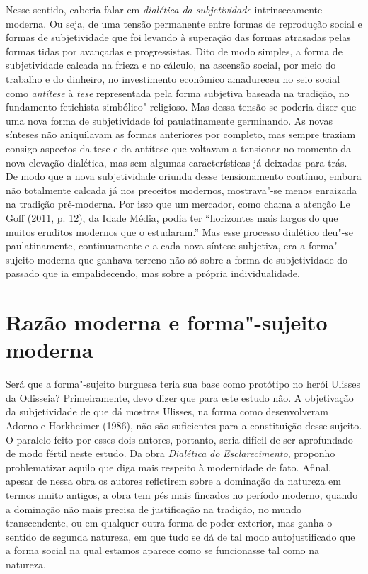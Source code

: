 Nesse sentido, caberia falar em \emph{dialética da subjetividade}
intrinsecamente moderna. Ou seja, de uma tensão permanente entre
formas de reprodução social e formas de subjetividade que foi levando à
superação das formas atrasadas pelas formas tidas por avançadas e
progressistas. Dito de modo simples, a forma de subjetividade calcada na
frieza e no cálculo, na ascensão social, por meio do trabalho e do
dinheiro, no investimento econômico amadureceu no seio social como
\emph{antítese} à \emph{tese} representada pela forma subjetiva baseada
na tradição, no fundamento fetichista simbólico"-religioso. Mas dessa
tensão se poderia dizer que uma nova forma de subjetividade foi
paulatinamente germinando. As novas sínteses não aniquilavam as formas
anteriores por completo, mas sempre traziam consigo aspectos da tese e
da antítese que voltavam a tensionar no momento da nova elevação
dialética, mas sem algumas características já deixadas para trás. De
modo que a nova subjetividade oriunda desse tensionamento contínuo,
embora não totalmente calcada já nos preceitos modernos, mostrava"-se
menos enraizada na tradição pré-moderna. Por isso que um mercador, como
chama a atenção Le Goff (2011, p. 12), da Idade Média, podia ter
``horizontes mais largos do que muitos eruditos modernos que o
estudaram.'' Mas esse processo dialético deu"-se paulatinamente,
continuamente e a cada nova síntese subjetiva, era a forma"-sujeito
moderna que ganhava terreno não só sobre a forma de subjetividade do
passado que ia empalidecendo, mas sobre a própria individualidade.

\section{Razão moderna e forma"-sujeito moderna}

Será que a forma"-sujeito burguesa teria sua base como protótipo no herói
Ulisses da Odisseia? Primeiramente, devo dizer que para este
estudo não. A objetivação da subjetividade de que dá mostras Ulisses, na
forma como desenvolveram Adorno e Horkheimer (1986), não são suficientes
para a constituição desse sujeito. O paralelo feito por esses dois
autores, portanto, seria difícil de ser aprofundado de modo fértil
neste estudo. Da obra \emph{Dialética} \emph{do} \emph{Esclarecimento},
proponho problematizar aquilo que diga mais respeito à modernidade de fato.
Afinal, apesar de nessa obra os autores refletirem sobre a dominação da
natureza em termos muito antigos, a obra tem pés mais fincados no
período moderno, quando a dominação não mais precisa de justificação na
tradição, no mundo transcendente, ou em qualquer outra forma de poder
exterior, mas ganha o sentido de segunda natureza, em que tudo se dá de
tal modo autojustificado que a forma social na qual estamos aparece como
se funcionasse tal como na natureza.


